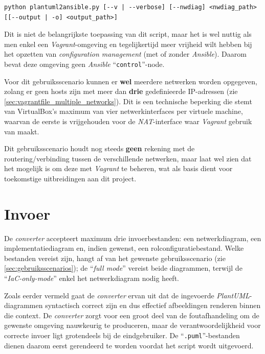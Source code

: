\begin{codeblock}
  \begin{lstlisting}
python plantuml2ansible.py [--v | --verbose] [--nwdiag] <nwdiag_path> [[--output | -o] <output_path>]
\end{lstlisting}
  \caption[\emph{CLI}-gebruik ``\emph{IaC-only-mode}'']{\emph{CLI}-gebruik voor het ``\emph{IaC-only-mode}''-gebruiksscenario}
  \label{code:cli_gebruik_iac_only_mode}
\end{codeblock}

Dit is niet de belangrijkste toepassing van dit script, maar het is wel nuttig als men enkel een \emph{Vagrant}-omgeving en tegelijkertijd meer vrijheid wilt hebben bij het opzetten van \emph{configuration management} (met of zonder \emph{Ansible}). Daarom bevat deze omgeving geen \emph{Ansible} ``\texttt{control}''-node.

Voor dit gebruiksscenario kunnen er \textbf{wel} meerdere netwerken worden opgegeven, zolang er geen hosts zijn met meer dan \textbf{drie} gedefinieerde IP-adressen (zie \autoref{sec:vagrantfile_multiple_networks}). Dit is een technische beperking die stemt van VirtualBox's maximum van vier netwerkinterfaces per virtuele machine, waarvan de eerste is vrijgehouden voor de \emph{NAT}-interface waar \emph{Vagrant} gebruik van maakt.

Dit gebruiksscenario houdt nog steeds \textbf{geen} rekening met de routering/verbinding tussen de verschillende netwerken, maar laat wel zien dat het mogelijk is om deze met \emph{Vagrant} te beheren, wat als basis dient voor toekomstige uitbreidingen aan dit project.

\section{Invoer}%
\label{sec:invoer}

De \emph{converter} accepteert maximum drie invoerbestanden: een netwerkdiagram, een implementatiediagram en, indien gewenst, een rolconfiguratiebestand. Welke bestanden vereist zijn, hangt af van het gewenste gebruiksscenario (zie \autoref{sec:gebruiksscenarios}); de ``\emph{full mode}'' vereist beide diagrammen, terwijl de ``\emph{IaC-only-mode}'' enkel het netwerkdiagram nodig heeft.

Zoals eerder vermeld gaat de \emph{converter} ervan uit dat de ingevoerde \emph{PlantUML}-diagrammen syntactisch correct zijn en dus effectief afbeeldingen renderen binnen die context. De \emph{converter} zorgt voor een groot deel van de foutafhandeling om de gewenste omgeving nauwkeurig te produceren, maar de verantwoordelijkheid voor correcte invoer ligt grotendeels bij de eindgebruiker. De ``\texttt{.puml}''-bestanden dienen daarom eerst gerendeerd te worden voordat het script wordt uitgevoerd.

